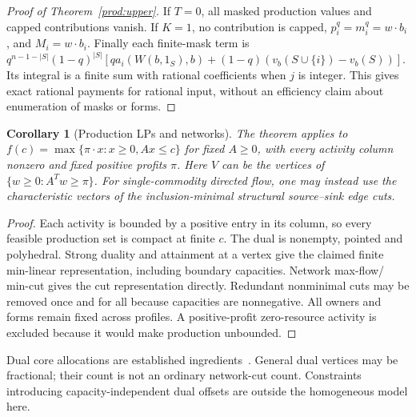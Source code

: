 \documentclass[11pt]{article}
\newtheorem{corollary}[theorem]{Corollary}
\theoremstyle{definition}\newtheorem{definition}[theorem]{Definition}
\theoremstyle{remark}\newtheorem{remark}[theorem]{Remark}
\begin{document}
\begin{proof}[Proof of Theorem~\ref{prod:upper}]
If $T=0$, all masked production values and capped contributions vanish.
If $K=1$, no contribution is capped, $p_i^q=m_i^q=w\cdot b_i$, and
$M_i=w\cdot b_i$. Finally each finite-mask term is
$q^{n-1-|S|}(1-q)^{|S|}[q a_i(W(b,1_S),b)+(1-q)(v_b(S\cup\{i\})-v_b(S))]$.
Its integral is a finite sum with rational coefficients when $j$ is integer.
This gives exact rational payments for rational input, without an efficiency
claim about enumeration of masks or forms.
\end{proof}

\begin{corollary}[Production LPs and networks]\label{prod:lp}
The theorem applies to
$f(c)=\max\{\pi\cdot x:x\ge0,Ax\le c\}$ for fixed $A\ge0$, with every
activity column nonzero and fixed positive profits $\pi$. Here $V$ can be
the vertices of $\{w\ge0:A^Tw\ge\pi\}$. For single-commodity directed flow,
one may instead use the characteristic vectors of the inclusion-minimal
structural source--sink edge cuts.
\end{corollary}
\begin{proof}
Each activity is bounded by a positive entry in its column, so every feasible
production set is compact at finite $c$. The dual is nonempty, pointed and
polyhedral. Strong duality and attainment at a vertex give the claimed finite
min-linear representation, including boundary capacities. Network max-flow/
min-cut gives the cut representation directly. Redundant nonminimal cuts may
be removed once and for all because capacities are nonnegative. All owners
and forms remain fixed across profiles. A positive-profit zero-resource
activity is excluded because it would make production unbounded.
\end{proof}
Dual core allocations are established ingredients~\cite{Owen,SametZemel}.
General dual vertices may be fractional; their count is not an ordinary
network-cut count. Constraints introducing capacity-independent dual offsets
are outside the homogeneous model here.
\end{document}
